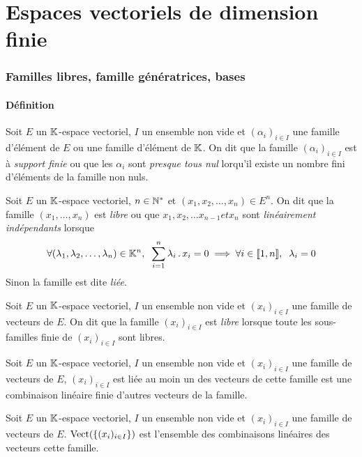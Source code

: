 \part{Espaces vectoriels de dimension finie}


\section{Familles libres, famille génératrices, bases}


\subsection{Définition}

\begin{dfn}
Soit $E$ un $\mathbb{K}$-espace vectoriel, $I$ un ensemble non vide et
$(\alpha_i)_{i \in I}$ une famille d'élément de $E$ ou une famille
d'élément de $\mathbb{K}$. On dit que la famille $(\alpha_i)_{i \in I}$ est à
\emph{support finie} ou que les $\alpha_i$ sont \emph{presque tous nul}
lorqu'il existe un nombre fini d'éléments de la famille non nuls.
\end{dfn}

\begin{dfn}
Soit $E$ un $\mathbb{K}$-espace vectoriel, $n \in \mathbb{N}^*$ et 
$(x_1, x_2, \ldots, x_n) \in E^n$. On dit que la famille
$(x_1, \ldots, x_n)$ est \emph{libre} ou que $x_1, x_2, \ldots x_{n - 1} 
et x_n$ sont \emph{linéairement indépendants} lorsque
\[
    \forall (\lambda_1, \lambda_2, \ldots, \lambda_n) \in \mathbb{K}^n, \;\;
    \sum_{i = 1}^n \lambda_i \operatorname{.} x_i = 0 \implies \forall
    i \in \llbracket 1, n \rrbracket, \;\; \lambda_i = 0
\]
Sinon la famille est dite \emph{liée}.
\end{dfn}

\begin{dfn}
Soit $E$ un $\mathbb{K}$-espace vectoriel, $I$ un ensemble non vide et
$(x_i)_{i \in I}$ une famille de vecteurs de $E$. On dit que la famille
$(x_i)_{i \in I}$ est \emph{libre} lorsque toute les sous-familles finie de
$(x_i)_{i \in I}$ sont libres.
\end{dfn}

\begin{prp}
Soit $E$ un $\mathbb{K}$-espace vectoriel, $I$ un ensemble non vide et
$(x_i)_{i \in I}$ une famille de vecteurs de $E$, $(x_i)_{i \in I}$ est
liée \ssi au moin un des vecteurs de cette famille est une combinaison
linéaire finie d'autres vecteurs de la famille.
\end{prp}

\begin{prp}
Soit $E$ un $\mathbb{K}$-espace vectoriel, $I$ un ensemble non vide et
$(x_i)_{i \in I}$ une famille de vecteurs de $E$. 
$\operatorname{Vect}(\left\{(x_i)_{i \in I}\right\})$ est l'ensemble des combinaisons
linéaires des vecteurs cette famille.
\end{prp}

